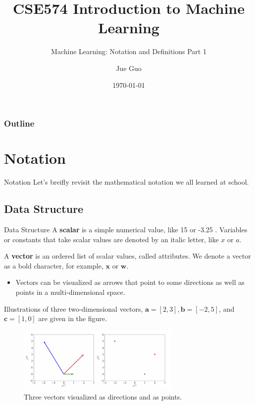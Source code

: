 \documentclass[9pt,dvipsnames]{beamer}
\title{CSE574 Introduction to Machine Learning}
\subtitle{Machine Learning: Notation and Definitions Part 1}
\author{Jue Guo}
\institute{University at Buffalo}
\date{\today}
\begin{document}
\begin{frame}
	\titlepage
\end{frame}

\begin{frame}
	\frametitle{Outline}
	\tableofcontents
\end{frame}

\section{Notation}
\begin{frame}{Notation}
	Let's breifly revisit the mathematical notation we all learned at school.
\end{frame}

\subsection{Data Structure}
\begin{frame}{Data Structure}
	A \textbf{scalar} is a simple numerical value, like 15 or -3.25 . Variables or constants that take scalar values are denoted by an italic letter, like $x$ or $a$.

	A \textbf{vector} is an ordered list of scalar values, called attributes. We denote a vector as a bold character, for example, $\mathbf{x}$ or $\mathbf{w}$.
	\begin{itemize}
		\item Vectors can be visualized as arrows that point to some directions as well as points in a multi-dimensional space.
	\end{itemize}
	Illustrations of three two-dimensional vectors, $\mathbf{a}=[2,3], \mathbf{b}=[-2,5]$, and $\mathbf{c}=[1,0]$ are given in the figure.
	\begin{figure}
		\centering
		\includegraphics[width=0.7\textwidth]{imgs/notation_1}
		\caption{Three vectors visualized as directions and as points.}
		\label{fig:notation1}
	\end{figure}
\end{frame}
\end{document}
